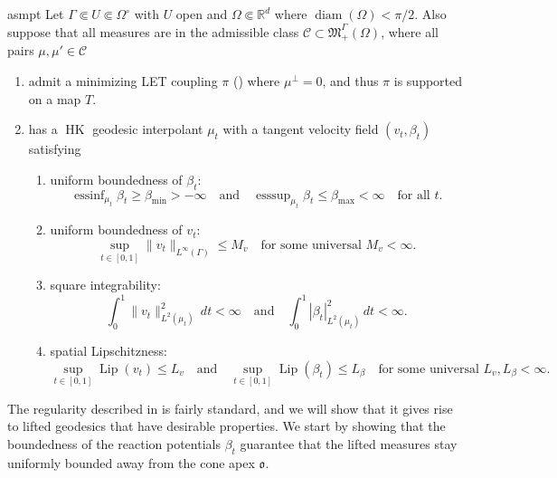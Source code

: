 \documentclass[11pt]{article}
\DeclareMathOperator{\esssup}{esssup}
\newcommand{\HK}{\operatorname{HK}}
\begin{document}
\begin{restatable}{asmpt}{} \label{admissible class}
    Let $\Gamma \Subset U \Subset  \Omega^\circ$ with $U$ open and $ \Omega\Subset \mathbb{R}^d$ where $\operatorname{diam}(\Omega)< \pi/2$. Also suppose that all measures are in the admissible class $\mathcal{C}\subset \mathfrak{M}_+^\Gamma(\Omega)$, where all pairs $\mu, \mu' \in \mathcal{C}$ 
    \begin{enumerate}[label=\textbf{(A.\arabic*)}, leftmargin=*, align=left]
        \item admit a minimizing LET coupling $\pi$ () where $\mu^\perp = 0$, and thus $\pi$ is supported on a map $T$. 
        \item has a $\HK$ geodesic interpolant $\mu_t$ with a tangent velocity field $(v_t, \beta_t)$ satisfying \label{interpolant regularity}
        \begin{enumerate}
            \item uniform boundedness of $\beta_t:$  \[\operatorname{essinf}_{\mu_t} \beta_t \geq \beta_{\min} > -\infty \quad \text{and} \quad \esssup_{\mu_t}\beta_t \leq \beta_{\max} < \infty \quad \text{for all $t.$}\]
            \item uniform boundedness of $v_t:$  \[\sup_{t \in [0,1]} \|v_t\|_{L^\infty(\Gamma)} \leq M_v \quad \text{for some universal $M_v < \infty.$}\]
            \item square integrability:
            \[\int_0^1\|v_t\|_{L^2(\mu_t)}^2 \, dt < \infty \quad \text{and} \quad \int_0^1 |\beta_t|_{L^2(\mu_t)}^2 \, dt < \infty.\]
            \item spatial Lipschitzness:
            \[\sup_{t\in [0,1]}\operatorname{Lip}(v_t) \leq L_v \quad \text{and} \quad \sup_{t \in [0,1]}\operatorname{Lip}(\beta_t) \leq L_\beta \quad \text{for some universal $L_v, L_\beta <\infty.$}\]
        \end{enumerate}
    \end{enumerate}
\end{restatable}

The regularity described in  is fairly standard, and we will show that it gives rise to lifted geodesics that have desirable properties. We start by showing that the boundedness of the reaction potentials $\beta_t$ guarantee that the lifted measures stay uniformly bounded away from the cone apex $\mathfrak{o}$. 
\end{document}
